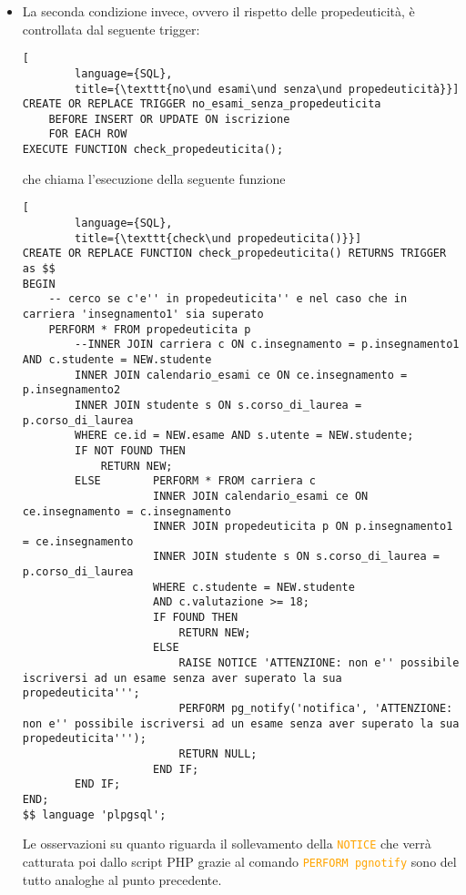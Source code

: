 \documentclass{article}
\newcommand{\sqlcommand}[1]{\texttt{\textcolor{orange}{#1}}}
\newcommand{\und}[0]{\textunderscore}
\begin{document}
\begin{itemize}
\begin{itemize}
        \item a livello di funzionalità, la funzione contiene anche i messaggi di informazione:
        \begin{itemize}
            \item la \sqlcommand{NOTICE} verrà mostrata come messaggio se la funzione viene chiamata da terminale
            \item il comando \sqlcommand{PERFORM pg\und notify} invece genererà una notifica che potrà essere catturata dal linguaggio di scripting PHP
        \end{itemize}
    \end{itemize}

    \item La seconda condizione invece, ovvero il rispetto delle propedeuticità, è controllata dal seguente trigger:
    \begin{lstlisting}[
        language={SQL},
        title={\texttt{no\und esami\und senza\und propedeuticità}}]
CREATE OR REPLACE TRIGGER no_esami_senza_propedeuticita
    BEFORE INSERT OR UPDATE ON iscrizione
    FOR EACH ROW
EXECUTE FUNCTION check_propedeuticita();
    \end{lstlisting}

    che chiama l'esecuzione della seguente funzione

    \begin{lstlisting}[
        language={SQL},
        title={\texttt{check\und propedeuticita()}}]
CREATE OR REPLACE FUNCTION check_propedeuticita() RETURNS TRIGGER as $$
BEGIN
    -- cerco se c'e'' in propedeuticita'' e nel caso che in carriera 'insegnamento1' sia superato
    PERFORM * FROM propedeuticita p
        --INNER JOIN carriera c ON c.insegnamento = p.insegnamento1 AND c.studente = NEW.studente
        INNER JOIN calendario_esami ce ON ce.insegnamento = p.insegnamento2
        INNER JOIN studente s ON s.corso_di_laurea = p.corso_di_laurea
        WHERE ce.id = NEW.esame AND s.utente = NEW.studente;
        IF NOT FOUND THEN
            RETURN NEW;
        ELSE        PERFORM * FROM carriera c
                    INNER JOIN calendario_esami ce ON ce.insegnamento = c.insegnamento
                    INNER JOIN propedeuticita p ON p.insegnamento1 = ce.insegnamento
                    INNER JOIN studente s ON s.corso_di_laurea = p.corso_di_laurea
                    WHERE c.studente = NEW.studente
                    AND c.valutazione >= 18;
                    IF FOUND THEN
                        RETURN NEW;
                    ELSE
                        RAISE NOTICE 'ATTENZIONE: non e'' possibile iscriversi ad un esame senza aver superato la sua propedeuticita''';
                        PERFORM pg_notify('notifica', 'ATTENZIONE: non e'' possibile iscriversi ad un esame senza aver superato la sua propedeuticita''');
                        RETURN NULL;
                    END IF;
        END IF;
END;
$$ language 'plpgsql';
    \end{lstlisting}
    Le osservazioni su quanto riguarda il sollevamento della \sqlcommand{NOTICE} che verrà catturata poi dallo script PHP grazie al comando \sqlcommand{PERFORM pg\und notify} sono del tutto analoghe al punto precedente.
\end{itemize}
\end{document}
